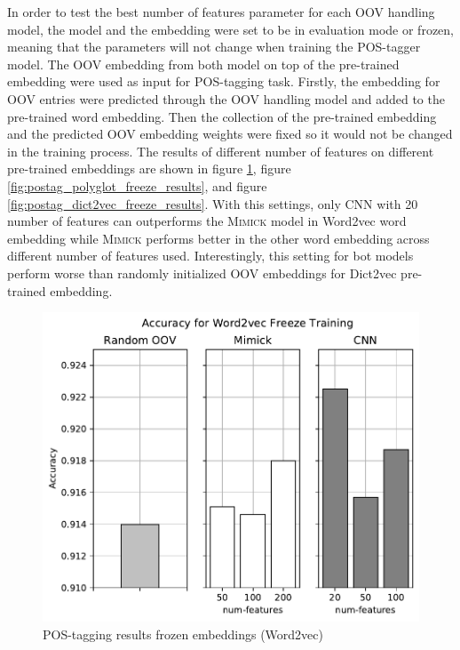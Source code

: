       In order to test the best number of features parameter for each
      OOV handling model, the model and the embedding were set to be
      in evaluation mode or frozen, meaning that the parameters will
      not change when training the POS-tagger model. The OOV embedding
      from both model on top of the pre-trained embedding were used as
      input for POS-tagging task. Firstly, the embedding for OOV
      entries were predicted through the OOV handling model and added to the
      pre-trained word embedding. Then the collection of the
      pre-trained embedding and the predicted OOV embedding weights
      were fixed so it would not be changed in the training process. The
      results of different number of features on different pre-trained
      embeddings are shown in figure
      \ref{fig:postag_word2vec_freeze_results}, figure
      \ref{fig:postag_polyglot_freeze_results}, and figure
      \ref{fig:postag_dict2vec_freeze_results}. With this settings,
      only CNN with 20 number of features can outperforms the
      \textsc{Mimick} model in Word2vec word embedding while
      \textsc{Mimick} performs better in the other word embedding
      across different number of features used. Interestingly, this
      setting for bot models perform worse than randomly initialized
      OOV embeddings for Dict2vec pre-trained embedding.
      \begin{figure}[H]
        \centering
        \includegraphics[width=0.8\linewidth]{images/freeze_word2vec.pdf}
        \caption{POS-tagging results frozen embeddings (Word2vec)}
        \label{fig:postag_word2vec_freeze_results}
      \end{figure}
